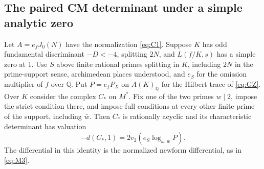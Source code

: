 \subsection{The paired CM determinant under a simple analytic zero}

\begin{proposition}\label{cm:paired}
Let \(A=e_fJ_0(N)\) have the normalization \eqref{eq:C1}. Suppose \(K\) has odd fundamental
discriminant \(-D<-4\), splitting \(2N\), and \(L(f/K,s)\) has a simple zero at 1. Use \(S\)
above finite rational primes splitting in \(K\), including \(2N\) in the prime-support sense,
archimedean places understood, and \(e_S\) for the omission multiplier of \(f\) over \(\mathbb
Q\). Put \(P=e_f P_X\) on \(A(K)_{\mathbb Q}\) for the Hilbert trace of \eqref{eq:GZ}. Over
\(K\) consider the complex \(C_*\) on \(M^*\). Fix one of the two primes \(w\mid2\),
impose the strict condition there, and impose full conditions at every other finite
prime of the support, including \(\bar w\). Then \(C_*\) is rationally acyclic and its characteristic determinant
has valuation
\[
                 -d(C_*,1)=2v_2(e_S\log_{\omega,w} P).               \tag{C-pair}\label{eq:C-pair}
\]
The differential in this identity is the normalized newform
differential, as in \eqref{eq:M3}.
\end{proposition}

